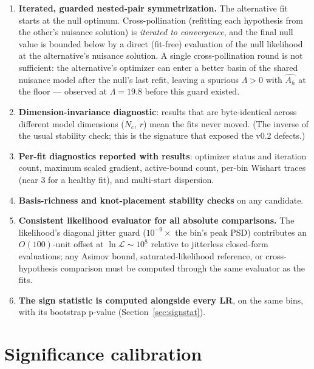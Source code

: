 \documentclass[11pt]{article}
\newcommand{\Ah}{A_h}
\begin{document}
\begin{enumerate}
\item \textbf{Iterated, guarded nested-pair symmetrization.} The alternative fit starts at the null optimum. Cross-pollination (refitting each hypothesis from the other's nuisance solution) is \emph{iterated to convergence}, and the final null value is bounded below by a direct (fit-free) evaluation of the null likelihood at the alternative's nuisance solution. A single cross-pollination round is not sufficient: the alternative's optimizer can enter a better basin of the shared nuisance model after the null's last refit, leaving a spurious $\Lambda > 0$ with $\hat{\Ah}$ at the floor --- observed at $\Lambda = 19.8$ before this guard existed.
\item \textbf{Dimension-invariance diagnostic}: results that are byte-identical across different model dimensions ($N_c$, $r$) mean the fits never moved. (The inverse of the usual stability check; this is the signature that exposed the v0.2 defects.)
\item \textbf{Per-fit diagnostics reported with results}: optimizer status and iteration count, maximum scaled gradient, active-bound count, per-bin Wishart traces (near 3 for a healthy fit), and multi-start dispersion.
\item \textbf{Basis-richness and knot-placement stability checks} on any candidate.
\item \textbf{Consistent likelihood evaluator for all absolute comparisons.} The likelihood's diagonal jitter guard ($10^{-9}\times$ the bin's peak PSD) contributes an $O(100)$-unit offset at $\ln\mathcal{L} \sim 10^8$ relative to jitterless closed-form evaluations; any Asimov bound, saturated-likelihood reference, or cross-hypothesis comparison must be computed through the same evaluator as the fits.
\item \textbf{The sign statistic is computed alongside every LR}, on the same bins, with its bootstrap p-value (Section~\ref{sec:signstat}).
\end{enumerate}

\section{Significance calibration}
\label{sec:bootstrap}
\end{document}
